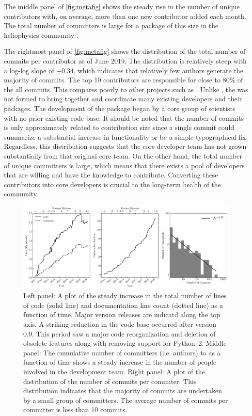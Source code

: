 The middle panel of \autoref{fig:metafig} shows the steady rise in the number of unique contributors with, on average, more than one new contributor added each month.
The total number of committers is large for a package of this size in the heliophysics community \citep{pyhc2018}.

The rightmost panel of \autoref{fig:metafig} shows the distribution of the total number of commits per contributor as of June 2019.
The distribution is relatively steep with a log-log slope of $-0.34$, which indicates that relatively few authors generate the majority of commits.
The top 10 contributors are responsible for close to 80\% of the all commits.
This compares poorly to other projects such as \astropy \citep{astropy2018}.
Unlike \astropy, the \sunpyproj was not formed to bring together and coordinate many existing developers and their \python packages.
The development of the \sunpypkg package began by a core group of scientists with no prior existing code base.
It should be noted that the number of commits is only approximately related to contribution size since a single commit could summarize a substantial increase in functionality or be a simple typographical fix.
Regardless, this distribution suggests that the core developer team has not grown substantially from that original core team.
On the other hand, the total number of unique committers is large, which means that there exists a pool of \sunpypkg developers that are willing and have the knowledge to contribute.
Converting these contributors into core developers is crucial to the long-term health of the community.


\begin{figure}
    \center
    \includegraphics[width = 1.0\textwidth]{figures/dev_meta.pdf}
    \caption{Left panel: A plot of the steady increase in the total number of lines of code (solid line) and documentation line count (dotted line) as a function of time.
	Major version releases are indicatd along the top axis.
	A striking reduction in the code base occurred after version 0.9.
	This period saw a major code reorganization and deletion of obsolete features along with removing support for Python~2.
	Middle panel: The cumulative number of committers (i.e. authors) to \sunpypkg as a function of time shows a steady increase in the number of people involved in the development team.
	Right panel: A plot of the distribution of the number of commits per commiter.
	This distribution indicates that the majority of commits are undertaken by a small group of committers. The average number of commits per committer is less than 10 commits.}
\label{fig:metafig}
\end{figure}
